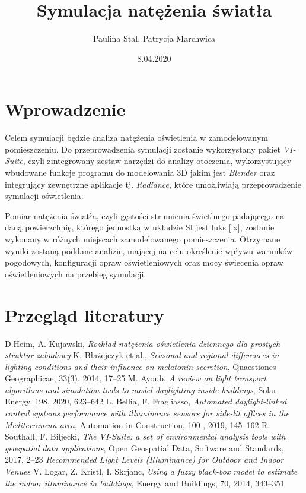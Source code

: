 \documentclass[a4paper,12pt]{article}
\title{Symulacja natężenia światła}
\author{Paulina Stal, Patrycja Marchwica}
\date{8.04.2020}
\begin{document}
\maketitle

	\section{Wprowadzenie}
	\label{sec:wprowadzenie}
	
	Celem symulacji będzie analiza natężenia oświetlenia w zamodelowanym pomieszczeniu. Do przeprowadzenia symulacji zostanie wykorzystany pakiet \emph{VI-Suite}, czyli zintegrowany zestaw narzędzi do analizy otoczenia, wykorzystujący wbudowane funkcje programu do modelowania 3D jakim jest \emph{Blender} oraz integrujący zewnętrzne aplikacje tj. \emph{Radiance}, które umożliwiają przeprowadzenie symulacji oświetlenia.

	Pomiar natężenia światła, czyli gęstości strumienia świetlnego padającego na daną powierzchnię, którego jednostką w układzie SI jest luks [lx], zostanie wykonany w różnych miejscach zamodelowanego pomieszczenia. Otrzymane wyniki zostaną poddane analizie, mającej na celu określenie wpływu warunków pogodowych, konfiguracji opraw oświetleniowych oraz mocy świecenia opraw oświetleniowych na przebieg symulacji.  

	
	\section{Przegląd literatury}
	\label{sec:przeglad_literatury}
		\begin{thebibliography}{7}
			D.Heim, A. Kujawski, \textit{Rozkład natężenia oświetlenia dziennego dla prostych struktur zabudowy}
			K. Błażejczyk et al., \textit{Seasonal and regional differences in lighting conditions and their influence on melatonin secretion}, Quaestiones Geographicae, 33(3), 2014, 17--25
			M. Ayoub, \textit{A review on light transport algorithms and simulation tools to model daylighting inside buildings}, Solar Energy, 198, 2020, 623--642
			L. Bellia, F. Fragliasso, \textit{Automated daylight-linked control systems performance with illuminance sensors for side-lit offices in the Mediterranean area}, Automation in Construction, 100 , 2019, 145--162
			R. Southall, F. Biljecki, \textit{The VI-Suite: a set of environmental analysis tools with geospatial data applications}, Open Geospatial Data, Software and Standards, 2017, 2--23
			\textit{Recommended Light Levels (Illuminance) for Outdoor and Indoor Venues}
			V. Logar, Z. Kristl, I. Skrjanc, \textit{Using a fuzzy black-box model to estimate the indoor illuminance in buildings}, Energy and Buildings, 70, 2014, 343--351
			
		\end{thebibliography}
	
\end{document}
